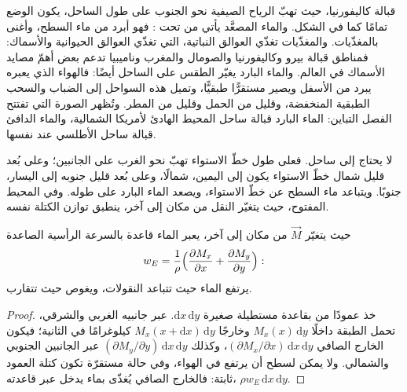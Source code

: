 
قبالة كاليفورنيا، حيث تهبّ الرياح الصيفية نحو الجنوب على طول الساحل، يكون الوضع تمامًا كما في الشكل. والماء المصعَّد يأتي من تحت : فهو أبرد من ماء السطح، وأغنى بالمغذّيات. والمغذّيات تغذّي العوالق النباتية، التي تغذّي العوالق الحيوانية والأسماك: فمناطق  قبالة بيرو وكاليفورنيا والصومال والمغرب وناميبيا تدعم بعض أهمّ مصايد الأسماك في العالم. والماء البارد يغيّر الطقس على الساحل أيضًا: فالهواء الذي يعبره يبرد من الأسفل ويصير مستقرًّا طبقيًّا، وتميل هذه السواحل إلى الضباب والسحب الطبقية المنخفضة، وقليل من الحمل وقليل من المطر. وتُظهر الصورة التي تفتتح الفصل التباين: الماء البارد قبالة ساحل المحيط الهادئ لأمريكا الشمالية، والماء الدافئ قبالة ساحل الأطلسي عند  نفسها.

 لا يحتاج إلى ساحل. فعلى طول خطّ الاستواء تهبّ  نحو الغرب على الجانبين؛ وعلى بُعد قليل شمال خطّ الاستواء يكون  إلى اليمين، شمالًا، وعلى بُعد قليل جنوبه إلى اليسار، جنوبًا. ويتباعد ماء السطح عن خطّ الاستواء، ويصعد الماء البارد على طوله. وفي المحيط المفتوح، حيث يتغيّر النقل من مكان إلى آخر، ينطبق توازن الكتلة نفسه.

\begin{proposition}[ضخّ إيكمان]\label{prop:b1:ocean-circulation:pumping}
حيث يتغيّر  $\vec M$ من مكان إلى آخر، يعبر الماء قاعدة  بالسرعة الرأسية الصاعدة
\[
  w_E = \frac{1}{\rho}\Bigl(\frac{\partial M_x}{\partial x} + \frac{\partial M_y}{\partial y}\Bigr):
\]
يرتفع الماء حيث تتباعد النقولات، ويغوص حيث تتقارب.
\end{proposition}

\begin{proof}
خذ عمودًا من  بقاعدة مستطيلة صغيرة $\mathrm dx\,\mathrm
dy$. عبر جانبيه الغربي والشرقي، تحمل الطبقة داخلًا $M_x(x)\,\mathrm dy$ وخارجًا $M_x(x + \mathrm dx)\,\mathrm dy$ كيلوغرامًا في الثانية؛ فيكون الخارج الصافي $(\partial M_x/\partial x)\,\mathrm dx\,\mathrm dy$، وكذلك $(\partial M_y/\partial y)\,\mathrm dx\,\mathrm dy$ عبر الجانبين الجنوبي والشمالي. ولا يمكن لسطح أن يرتفع في الهواء، وفي حالة مستقرّة تكون كتلة العمود ثابتة: فالخارج الصافي يُغذّى بماء يدخل عبر قاعدته، $\rho w_E\,\mathrm dx\,\mathrm dy$.
\end{proof}

